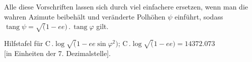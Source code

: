 \par\clearpage
\noindent\makebox[12mm][l]{}\par\medskip

Alle diese Vorschriften lassen sich durch viel einfachere ersetzen,
wenn man die wahren Azimute beibehält und veränderte Polhöhen \(\psi\) einführt,
sodass \(\operatorname{tang}\psi=\surd(1-ee)\,.\,\operatorname{tang}\varphi\) gilt.

\begin{center}
Hilfstafel für \(\mathrm C\,.\log\surd(1-ee\sin\varphi^2)\);
\(\mathrm C\,.\log\surd(1-ee)=14372.073\)\\
{[in Einheiten der 7. Dezimalstelle].}
\end{center}

